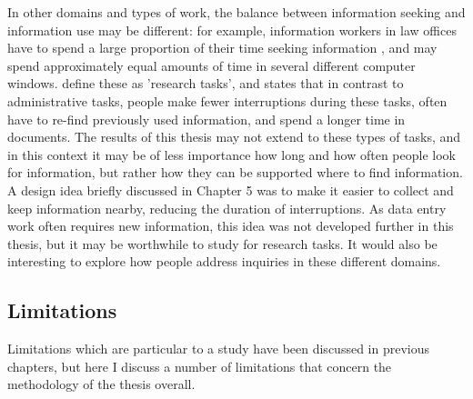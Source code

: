In other domains and types of work, the balance between information seeking and information use may be different: for example, information workers in law offices have to spend a large proportion of their time seeking information \citep{Cangiano2009}, and may spend approximately equal amounts of time in several different computer windows. \citet{Bondarenko2005} define these as 'research tasks', and states that in contrast to administrative tasks, people make fewer interruptions during these tasks, often have to re-find previously used information, and spend a longer time in documents. The results of this thesis may not extend to these types of tasks, and in this context it may be of less importance how long and how often people look for information, but rather how they can be supported where to find information. A design idea briefly discussed in Chapter 5 was to make it easier to collect and keep information nearby, reducing the duration of interruptions. As data entry work often requires new information, this idea was not developed further in this thesis, but it may be worthwhile to study for research tasks. It would also be interesting to explore how people address inquiries in these different domains. 


\subsection{Limitations}
Limitations which are particular to a study have been discussed in previous chapters, but here I discuss a number of limitations that concern the methodology of the thesis overall. 

